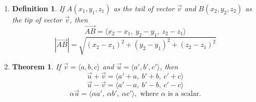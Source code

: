 \documentclass[12pt,a4paper]{article}
\newtheorem{thm}{Theorem}[subsection]
\newtheorem{df}{Definition}[subsection]
\def\vecv{\vec{v}}
\def\vecu{\vec{u}}
\begin{document}
\begin{enumerate}
\begin{center}
	\end{center}
	\item \begin{df} If $A(x_1,y_1,z_1)$ as the tail of vector $\vecv$ and $B(x_2,y_2,z_2)$ as the tip of vector $\vecv$, then \[\overrightarrow{AB}=\langle x_2-x_1,\ y_2-y_1,\ z_2-z_1\rangle\]\[|\overrightarrow{AB}|=\sqrt{(x_2-x_1)^2+(y_2-y_1)^2+(z_2-z_1)^2}\]\end{df}
	\item \begin{thm}If $\vecv=\langle a,b,c\rangle$ and $\vecu=\langle a',b',c'\rangle$, then \[\vecu+\vecv=\langle a'+a,\ b'+b,\ c'+c\rangle\]\[\vecu-\vecv=\langle a'-a,\ b'-b,\ c'-c\rangle\]\[\alpha\vecu=\langle\alpha a',\ \alpha b',\ \alpha c'\rangle,\text{ where }\alpha\text{ is a scalar.}\]\end{thm}
\end{enumerate}
\end{document}
